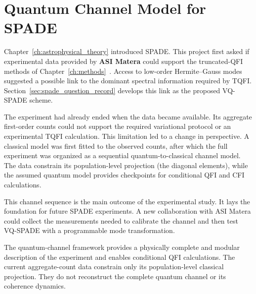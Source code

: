 \chapter{Quantum Channel Model for SPADE}
\label{ch:exoplanet_experiment}

Chapter~\ref{ch:astrophysical_theory} introduced SPADE.  This project first asked if experimental data provided by \textbf{ASI Matera} could support the truncated-QFI methods of Chapter~\ref{ch:methods}~\cite{Santamaria2024single}.  Access to low-order Hermite--Gauss modes suggested a possible link to the dominant spectral information required by TQFI.  Section~\ref{sec:spade_question_record} develops this link as the proposed VQ-SPADE scheme.

The experiment had already ended when the data became available.  Its aggregate first-order counts could not support the required variational protocol or an experimental TQFI calculation.  This limitation led to a change in perspective.  A classical model was first fitted to the observed counts, after which the full experiment was organized as a sequential quantum-to-classical channel model.  The data constrain its population-level projection (the diagonal elements), while the assumed quantum model provides checkpoints for conditional QFI and CFI calculations.

This channel sequence is the main outcome of the experimental study.  It lays the foundation for future SPADE experiments.  A new collaboration with ASI Matera could collect the measurements needed to calibrate the channel and then test VQ-SPADE with a programmable mode transformation.

\begin{remark}
    The quantum-channel framework provides a physically complete and modular description of the experiment and enables conditional QFI calculations.  The current aggregate-count data constrain only its population-level classical projection.  They do not reconstruct the complete quantum channel or its coherence dynamics.
\end{remark}



